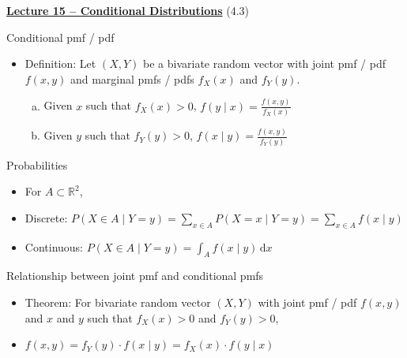 \documentclass{article}
\newcommand{\bu}[1]{\textbf{\ul{#1}}}				%
\newcommand{\integral}[4]{\displaystyle \int_{#1}^{#2} #3 \,\mathrm{d} #4}		%
\begin{document}
{\large \bu{Lecture 15 -- Conditional Distributions}} (4.3)\bigskip

Conditional pmf / pdf
\begin{itemize}
    \item Definition: Let $(X,Y)$ be a bivariate random vector with joint pmf / pdf $f(x,y)$ and marginal pmfs / pdfs $f_X(x)$ and $f_Y(y)$.
    \begin{enumerate}[(a)]
        \item Given $x$ such that $f_X(x) > 0$, \hspace{20pt} $\displaystyle f(y \mid x) = \frac{f(x,y)}{f_X(x)}$
        \item Given $y$ such that $f_Y(y) > 0$, \hspace{20pt}  $\displaystyle f(x \mid y) = \frac{f(x,y)}{f_Y(y)}$
    \end{enumerate}
\end{itemize}\bigskip

Probabilities
\begin{itemize}
    \item For $A \subset \mathbb{R}^2$,
    \item[] Discrete: $\displaystyle P(X \in A \mid Y = y) = \sum_{x \in A} P(X = x \mid Y = y) = \sum_{x \in A} f(x \mid y)$
    \item[] Continuous: $P(X \in A \mid Y = y) = \integral{A}{}{f(x \mid y)}{x}$
\end{itemize}\bigskip

Relationship between joint pmf and conditional pmfs
\begin{itemize}
    \item Theorem: For bivariate random vector $(X,Y)$ with joint pmf / pdf $f(x,y)$ and $x$ and $y$ such that $f_X(x) > 0$ and $f_Y(y) > 0$,
    \item[] $f(x, y) = f_Y(y) \cdot f(x \mid y) =  f_X(x) \cdot f(y \mid x)$
\end{itemize}\bigskip

\newpage
\end{document}

